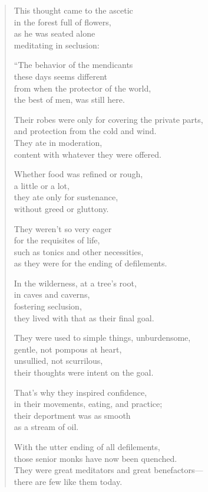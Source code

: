 \documentclass[12pt,openany]{book}%
\begin{document}
\begin{verse}%
This thought came to the ascetic \\
in the forest full of flowers, \\
as he was seated alone \\
meditating in seclusion: 

“The behavior of the mendicants \\
these days seems different \\
from when the protector of the world, \\
the best of men, was still here. 

Their robes were only for covering the private parts, \\
and protection from the cold and wind. \\
They ate in moderation, \\
content with whatever they were offered. 

Whether food was refined or rough, \\
a little or a lot, \\
they ate only for sustenance, \\
without greed or gluttony. 

They weren’t so very eager \\
for the requisites of life, \\
such as tonics and other necessities, \\
as they were for the ending of defilements. 

In the wilderness, at a tree’s root, \\
in caves and caverns, \\
fostering seclusion, \\
they lived with that as their final goal. 

They were used to simple things, unburdensome, \\
gentle, not pompous at heart, \\
unsullied, not scurrilous, \\
their thoughts were intent on the goal. 

That’s why they inspired confidence, \\
in their movements, eating, and practice; \\
their deportment was as smooth \\
as a stream of oil. 

With the utter ending of all defilements, \\
those senior monks have now been quenched. \\
They were great meditators and great benefactors—\\
there are few like them today. 


\end{verse}
\end{document}
